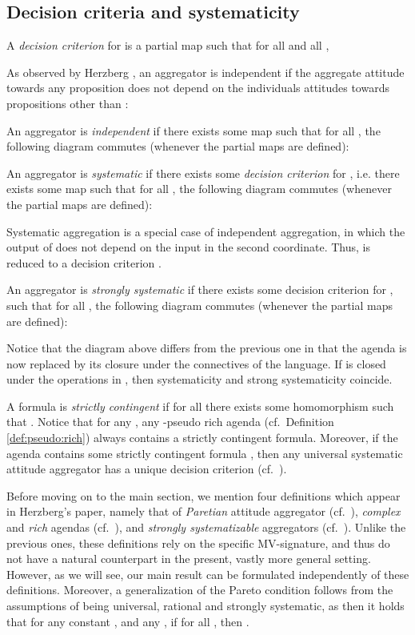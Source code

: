 \documentclass{llncs}
\numberwithin{equation}{section}
\begin{document}
\subsection{Decision criteria and systematicity}

A \emph{decision criterion} for  is a partial map  such that for all  and all ,


As observed by Herzberg \cite{He13}, an aggregator is independent if the aggregate attitude towards any proposition  does not depend on the individuals attitudes towards propositions other than :

An aggregator  is \emph{independent} if there exists some map  such that for all , the following diagram commutes (whenever the partial maps are defined):



An aggregator  is \emph{systematic} if there exists some \emph{decision criterion}  for , i.e. there exists some map  such that for all , the following diagram commutes (whenever the partial maps are defined):



Systematic aggregation is a special case of independent aggregation, in which the output of  does not depend on the input in the second coordinate.
Thus,  is reduced to a decision criterion .

An aggregator  is \emph{strongly systematic} if there exists some decision criterion  for , such that for all , the following diagram commutes (whenever the partial maps are defined):
	


Notice that the diagram above differs from the previous one in that the agenda  is now replaced by its closure  under the connectives of the language. If  is closed under the operations in , then systematicity and strong systematicity coincide.

A formula  is \emph{strictly contingent} if for all  there exists some homomorphism  such that .
Notice that for any , any -pseudo rich agenda (cf.\ Definition \ref{def:pseudo:rich}) always contains a strictly contingent formula.
Moreover, if the agenda contains some strictly contingent formula , then any universal systematic attitude aggregator  has a unique decision criterion (cf.\ \cite[Remark 3.5]{He13}).\label{page:unique:decision:criterion}

Before moving on to the main section, we mention four definitions which appear in Herzberg's paper, namely that of \emph{Paretian} attitude aggregator (cf.\ \cite[Definition 3.7]{He13}), \emph{complex} and \emph{rich} agendas (cf.\ \cite[Definition 3.8]{He13}), and \emph{strongly systematizable} aggregators (cf.\ \cite[Definition 3.9]{He13}). Unlike the previous ones, these definitions rely on the specific MV-signature, and thus do not have a natural counterpart in the present, vastly more general setting. However, as we will see, our main result can be formulated independently of these definitions.
Moreover, a generalization of the Pareto condition follows from the assumptions of   being universal, rational and strongly systematic, as then it holds that for any constant , and any , if  for all , then .
\end{document}
